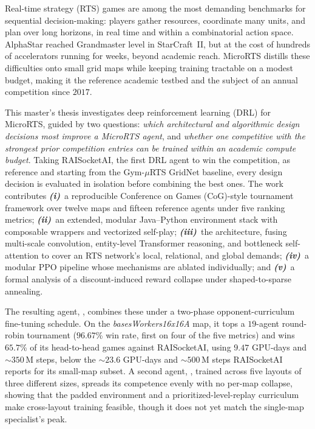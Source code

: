 \vspace*{\fill}

\noindent\hrulefill\quad{}\quad\hrulefill

\bigskip

Real-time strategy (RTS) games are among the most demanding benchmarks for sequential decision-making: players gather resources, coordinate many units, and plan over long horizons, in real time and within a combinatorial action space. AlphaStar reached Grandmaster level in StarCraft~II, but at the cost of hundreds of accelerators running for weeks, beyond academic reach. MicroRTS distills these difficulties onto small grid maps while keeping training tractable on a modest budget, making it the reference academic testbed and the subject of an annual competition since $2017$.

\medskip

This master's thesis investigates deep reinforcement learning (DRL) for MicroRTS, guided by two questions: \emph{which architectural and algorithmic design decisions most improve a MicroRTS agent}, and \emph{whether one competitive with the strongest prior competition entries can be trained within an academic compute budget}. Taking RAISocketAI, the first DRL agent to win the competition, as reference and starting from the Gym-$\mu$RTS GridNet baseline, every design decision is evaluated in isolation before combining the best ones. The work contributes \textbf{\emph{(i)}}~a reproducible Conference on Games (CoG)-style tournament framework over twelve maps and fifteen reference agents under five ranking metrics; \textbf{\emph{(ii)}}~an extended, modular Java--Python environment stack with composable wrappers and vectorized self-play; \textbf{\emph{(iii)}}~the  architecture, fusing multi-scale convolution, entity-level Transformer reasoning, and bottleneck self-attention to cover an RTS network's local, relational, and global demands; \textbf{\emph{(iv)}}~a modular PPO pipeline whose mechanisms are ablated individually; and \textbf{\emph{(v)}}~a formal analysis of a discount-induced reward collapse under shaped-to-sparse annealing.

\medskip

The resulting agent, , combines these under a two-phase opponent-curriculum fine-tuning schedule. On the \emph{basesWorkers16x16A} map, it tops a $19$-agent round-robin tournament ($96.67$\% win rate, first on four of the five metrics) and wins $65.7$\% of its head-to-head games against RAISocketAI, using $9.47$ GPU-days and ${\sim}350$\,M steps, below the ${\sim}23.6$ GPU-days and ${\sim}500$\,M steps RAISocketAI reports for its small-map subset. A second agent, , trained across five layouts of three different sizes, spreads its competence evenly with no per-map collapse, showing that the padded environment and a prioritized-level-replay curriculum make cross-layout training feasible, though it does not yet match the single-map specialist's peak.

